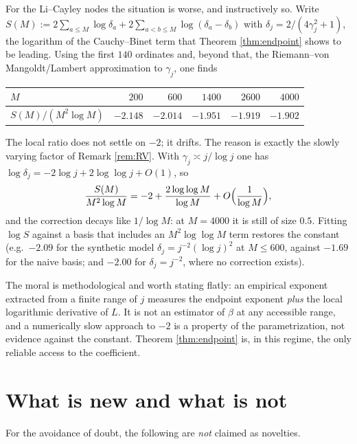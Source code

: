 \documentclass[11pt]{amsart}
\numberwithin{equation}{section}
\theoremstyle{plain}
\theoremstyle{definition}
\theoremstyle{remark}
\begin{document}
For the Li--Cayley nodes the situation is worse, and instructively so. Write
$S(M):=2\sum_{a\le M}\log\delta_{a}+2\sum_{a<b\le M}\log(\delta_{a}-\delta_{b})$ with
$\delta_{j}=2/(4\gamma_{j}^{2}+1)$, the logarithm of the Cauchy--Binet term that Theorem
\ref{thm:endpoint} shows to be leading. Using the first $140$ ordinates and, beyond that, the
Riemann--von Mangoldt/Lambert approximation to $\gamma_{j}$, one finds

\begin{center}
\begin{tabular}{lrrrrr}
\toprule
$M$ & $200$ & $600$ & $1400$ & $2600$ & $4000$\\
\midrule
$S(M)/(M^{2}\log M)$ & $-2.148$ & $-2.014$ & $-1.951$ & $-1.919$ & $-1.902$\\
\bottomrule
\end{tabular}
\end{center}

The local ratio does not settle on $-2$; it drifts. The reason is exactly the slowly varying factor
of Remark \ref{rem:RV}. With $\gamma_{j}\asymp j/\log j$ one has
$\log\delta_{j}=-2\log j+2\log\log j+O(1)$, so
\[
\frac{S(M)}{M^{2}\log M}=-2+\frac{2\log\log M}{\log M}+O\Bigl(\frac1{\log M}\Bigr),
\]
and the correction decays like $1/\log M$: at $M=4000$ it is still of size $0.5$. Fitting
$\log S$ against a basis that includes an $M^{2}\log\log M$ term restores the constant
(e.g.\ $-2.09$ for the synthetic model $\delta_{j}=j^{-2}(\log j)^{2}$ at $M\le600$, against
$-1.69$ for the naive basis; and $-2.00$ for $\delta_{j}=j^{-2}$, where no correction exists).

The moral is methodological and worth stating flatly: an empirical exponent extracted from a
finite range of $j$ measures the endpoint exponent \emph{plus} the local logarithmic derivative of
$L$. It is not an estimator of $\beta$ at any accessible range, and a numerically slow approach to
$-2$ is a property of the parametrization, not evidence against the constant. Theorem
\ref{thm:endpoint} is, in this regime, the only reliable access to the coefficient.

\section{What is new and what is not}
\label{sec:position}

For the avoidance of doubt, the following are \emph{not} claimed as novelties.
\end{document}
